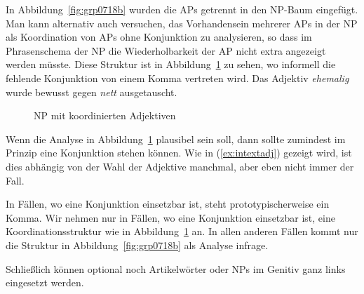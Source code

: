 In Abbildung~\ref{fig:grp0718b} wurden die APs getrennt in den NP-Baum eingefügt.
Man kann alternativ auch versuchen, das Vorhandensein mehrerer APs in der NP als Koordination von APs ohne Konjunktion zu analysieren, so dass im Phrasenschema der NP die Wiederholbarkeit der AP nicht extra angezeigt werden müsste.
Diese Struktur ist in Abbildung~\ref{fig:ngradjkonj} zu sehen, wo informell die fehlende Konjunktion von einem Komma vertreten wird.
Das Adjektiv \textit{ehemalig} wurde bewusst gegen \textit{nett} ausgetauscht.

\begin{figure}[!htbp]
  \centering
  \caption{NP mit koordinierten Adjektiven}
  \label{fig:ngradjkonj}
\end{figure}

Wenn die Analyse in Abbildung~\ref{fig:ngradjkonj} plausibel sein soll, dann sollte zumindest im Prinzip eine Konjunktion stehen können.
Wie in (\ref{ex:intextadj}) gezeigt wird, ist dies abhängig von der Wahl der Adjektive manchmal, aber eben nicht immer der Fall.

\begin{exe}
  \ex\label{ex:intextadj}
  \begin{xlist}
  \end{xlist}
\end{exe}

In Fällen, wo eine Konjunktion einsetzbar ist, steht prototypischerweise ein Komma.
Wir nehmen nur in Fällen, wo eine Konjunktion einsetzbar ist, eine Koordinationsstruktur wie in Abbildung~\ref{fig:ngradjkonj} an.
In allen anderen Fällen kommt nur die Struktur in Abbildung~\ref{fig:grp0718b} als Analyse infrage.

Schließlich können optional noch Artikelwörter oder NPs im Genitiv ganz links eingesetzt werden.

\begin{exe}
  \ex\label{ex:grp7000}
  \begin{xlist}
  \end{xlist}
\end{exe}

